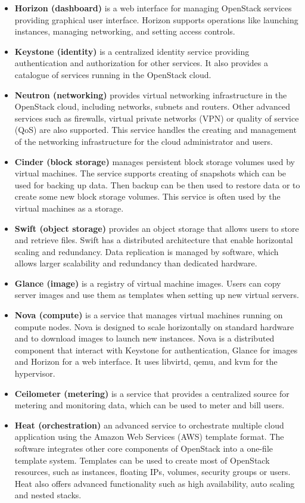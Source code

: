 \begin{itemize}
  \item{\textbf{Horizon (dashboard)} is a web interface for managing OpenStack services providing graphical user interface. Horizon supports operations like launching instances, managing networking, and setting access controls.}
  \item{\textbf{Keystone (identity)} is a centralized identity service providing authentication and authorization for other services. It also provides a catalogue of services running in the OpenStack cloud.}
  \item{\textbf{Neutron (networking)} provides virtual networking infrastructure in the OpenStack cloud, including networks, subnets and routers. Other advanced services such as firewalls, virtual private networks (VPN) or quality of service (QoS) are also supported. This service handles the creating and management of the networking infrastructure for the cloud administrator and users.}
  \item{\textbf{Cinder (block storage)} manages persistent block storage volumes used by virtual machines. The service supports creating of snapshots which can be used for backing up data. Then backup can be then used to restore data or to create some new block storage volumes. This service is often used by the virtual machines as a storage.}
  \item{\textbf{Swift (object storage)} provides an object storage that allows users to store and retrieve files. Swift has a distributed architecture that enable horizontal scaling and redundancy. Data replication is managed by software, which allows larger scalability and redundancy than dedicated hardware.}
  \item{\textbf{Glance (image)} is a registry of virtual machine images. Users can copy server images and use them as templates when setting up new virtual servers.}
  \item{\textbf{Nova (compute)} is a service that manages virtual machines running on compute nodes. Nova is designed to scale horizontally on standard hardware and to download images to launch new instances. Nova is a distributed component that interact with Keystone for authentication, Glance for images and Horizon for a web interface. It uses libvirtd, qemu, and kvm for the hypervisor.}
  \item{\textbf{Ceilometer (metering)} is a service that provides a centralized source for metering and monitoring data, which can be used to meter and bill users.}
  \item{\textbf{Heat (orchestration)} an advanced service to orchestrate multiple cloud application using the Amazon Web Services (AWS) template format. The software integrates other core components of OpenStack into a one-file template system. Templates can be used to create most of OpenStack resources, such as instances, floating IPs, volumes, security groups or users. Heat also offers advanced functionality such as high availability, auto scaling and nested stacks.}
\end{itemize}

